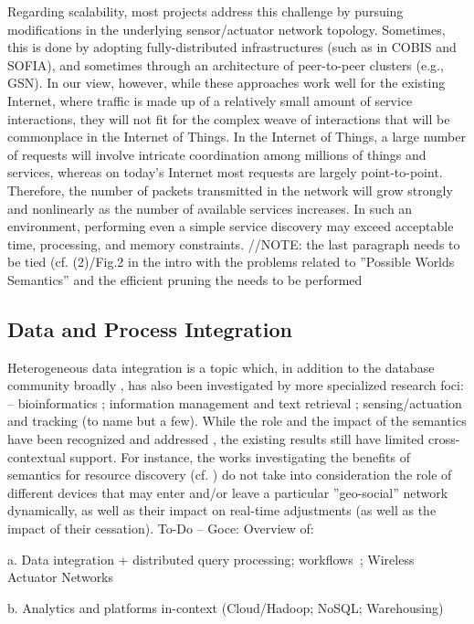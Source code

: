 Regarding scalability, most projects address this challenge by pursuing modifications in the underlying sensor/actuator network topology. Sometimes, this is done by adopting fully-distributed infrastructures (such as in COBIS and SOFIA), and sometimes through an architecture of peer-to-peer clusters (e.g., GSN). In our view, however, while these approaches work well for the existing Internet, where traffic is made up of a relatively small amount of service interactions, they will not fit for the complex weave of interactions that will be commonplace in the Internet of Things. In the Internet of Things, a large number of requests will involve intricate coordination among millions of things and services, whereas on today's Internet most requests are largely point-to-point. Therefore, the number of packets transmitted in the network will grow strongly and nonlinearly as the number of available services increases. In such an environment, performing even a simple service discovery may exceed acceptable time, processing, and memory constraints. //NOTE: the last paragraph needs to be tied (cf. (2)/Fig.2 in the intro with the problems related to ''Possible Worlds Semantics'' and the efficient pruning the needs to be performed

\subsection{Data and Process Integration}
Heterogeneous data integration is a topic which, in addition to the database community broadly \cite{Cohen98,HalevyRO06}, has also been investigated by more specialized research foci: -- bioinformatics \cite{KirstenR06,MostafaviM10}; information management and text retrieval \cite{CouletGDAMS11,HammerGIPUW95,Torlone08}; sensing/actuation and tracking \cite{AvciTS16,ChawatheKRS04,SalarianCN12} (to name but a few). While the role and the impact of the semantics have been recognized and addressed \cite{BergamaschiCVB01,CastanoFMR04}, the existing results still have limited cross-contextual support. For instance, the works investigating the benefits of semantics for resource discovery (cf. \cite{CastanoFMR04}) do not take into consideration the role of different devices that may enter and/or leave a particular ''geo-social'' network dynamically, as well as their impact on real-time adjustments (as well as the impact of their cessation).
To-Do -- Goce:
Overview of:

a.	Data integration + distributed query processing; workflows~\cite{LiCLWPZB12,PandeyB12,PoolaRB16}; Wireless Actuator Networks

b.	Analytics and platforms in-context (Cloud/Hadoop; NoSQL; Warehousing)~\cite{ToosiCB14}
